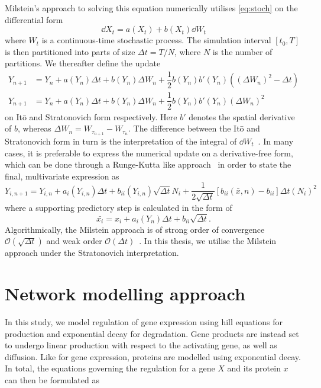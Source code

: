Milstein's approach to solving this equation numerically utilises
\cref{eq:stoch} on the differential form 
\begin{equation}
  \dd X_t = a(X_t) + b(X_t) \dd W_t
  \label{eq:milstein_form}
\end{equation}
where $W_t$ is a continuous-time stochastic process. The simulation interval
$\left[ t_0, T \right]$is then partitioned into parts of size $\Delta t = T /
N$, where $N$ is the number of partitions. We thereafter define the update
\begin{align}
  Y_{n+1} &= Y_n + 
  a(Y_n)\Delta t + 
  b(Y_n)\Delta W_n +
  \dfrac{1}{2}b(Y_n)b'(Y_n)\left( \left( \Delta W_n \right)^2 - \Delta t \right) \\
  Y_{n+1} &= Y_n + 
  a(Y_n)\Delta t + 
  b(Y_n)\Delta W_n + 
  \dfrac{1}{2} b(Y_n)b'(Y_n) \left(\Delta W_n\right)^2 
  \label{eq:milstein_deriv}
\end{align}
on It\={o} and Stratonovich form respectively. Here $b'$ denotes the spatial
derivative of $b$, whereas $\Delta W_n = W_{\tau_{n+1}} - W_{\tau_n}$. The
difference between the It\={o} and Stratonovich form in turn is the
interpretation of the integral of $\dd W_t$~\cite{klimontovich1990ito}. In many cases, it is
preferable to express the numerical update on a derivative-free form, which can
be done through a Runge-Kutta like approach~\cite{garcia2011comparison} in order to state the final,
multivariate expression as 
\begin{equation}
  Y_{i, n+1} = Y_{i, n} + a_i\left( Y_{i,n} \right) \Delta t + 
  b_{ii}(Y_{i,n}) \sqrt{\Delta t} N_i + \dfrac{1}{2\sqrt{\Delta t}} \left[
    b_{ii}(\bar x, n) - b_{ii} \right]
  \Delta t (N_i)^2 
  \label{eq:milstein_deriv_free}
\end{equation}
where a supporting predictory step is calculated in the form of 
\begin{equation}
  \bar {x_i} = x_i + a_i\left( Y_n \right)\Delta t + b_{ii}\sqrt {\Delta t}.
  \label{eq:milstein_predictor}
\end{equation}
Algorithmically, the Milstein approach is of strong order of convergence
$\mathcal O \left( \sqrt{\Delta t }\right)$ and weak order $\mathcal O \left(
  \Delta t \right)$~\cite{garcia2011comparison}. In this thesis, we utilise the Milstein approach under the
Stratonovich interpretation.

\section{Network modelling approach}
In this study, we model regulation of gene expression using hill equations for
production and exponential decay for degradation. Gene products are instead
set to undergo linear production with respect to the activating gene, as well as
diffusion. Like for gene expression, proteins are modelled using exponential
decay. In total, the equations governing the regulation for a gene $X$ and its
protein $x$ can then be formulated as

